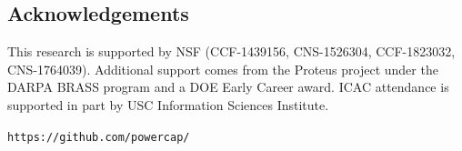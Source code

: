 \documentclass[a0,portrait]{a0poster}
\renewcommand{\small}{\fontsize{24.88}{30}\selectfont}
\begin{document}
\begin{multicols}{2}
%


\vspace{-1cm}
\section*{Acknowledgements}

\small
This research is supported by NSF (CCF-1439156, CNS-1526304, CCF-1823032, CNS-1764039).
Additional support comes from the Proteus project under the DARPA BRASS program and a DOE Early Career award.
ICAC attendance is supported in part by USC Information Sciences Institute.


\end{multicols}

\begin{center}
\vspace{0.5cm}
\Large \texttt{https://github.com/powercap/}
\end{center}
\end{document}
